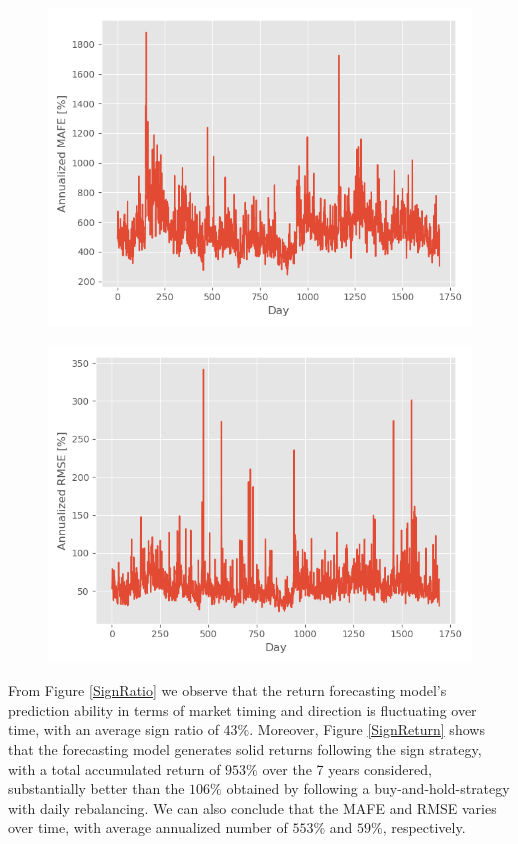 \begin{figure}
\centering
\begin{minipage}{.5\textwidth}
  \centering
  \includegraphics[scale=0.5]{Plot/EvaluationMAFE.png}
  \label{MAFE}
\end{minipage}%
\begin{minipage}{.5\textwidth}
  \centering
  \includegraphics[scale=0.5]{Plot/EvaluationRMSE.png}
  \label{RMSE}
\end{minipage}
\end{figure}

From Figure \ref{SignRatio} we observe that the return forecasting model's prediction ability in terms of market timing and direction is fluctuating over time, with an average sign ratio of $43\%$. Moreover, Figure \ref{SignReturn} shows that the forecasting model generates solid returns following the sign strategy, with a total accumulated return of $953\%$ over the 7 years considered, substantially better than the $106\%$ obtained by following a buy-and-hold-strategy with daily rebalancing. We can also conclude that the MAFE and RMSE varies over time, with average annualized number of $553\%$ and $59\%$, respectively.

